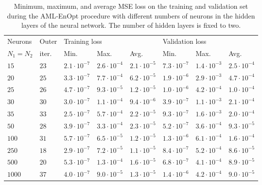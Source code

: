 \begin{table}
\caption{\label{DNNLossComparison}Minimum, maximum, and average MSE loss on the training and validation set during the AML-EnOpt procedure with different numbers of neurons in the hidden layers of the neural network. The number of hidden layers is fixed to two.}
\centering
\begin{tabular}{|l|l|lll|lll|}
\hline
Neurons & Outer  & \multicolumn{3}{l|}{Training loss} & \multicolumn{3}{l|}{Validation loss} \\
\cline{3-5}\cline{6-8}
$N_1=N_2$ & iter. & Min. & Max. & Avg. & Min. & Max. & Avg.\\
\hline
$15$ & $23$ & $2.1\cdot10^{-7}$ & $2.6\cdot10^{-4}$ & $2.1\cdot10^{-5}$ & $7.3\cdot10^{-7}$ & $1.4\cdot10^{-3}$ & $2.5\cdot10^{-4}$\\
$20$ & $25$ & $3.3\cdot10^{-7}$ & $7.7\cdot10^{-4}$ & $6.2\cdot10^{-5}$ & $1.9\cdot10^{-6}$ & $2.9\cdot10^{-3}$ & $4.7\cdot10^{-4}$\\
$25$ & $26$ & $4.7\cdot10^{-7}$ & $9.3\cdot10^{-5}$ & $1.2\cdot10^{-5}$ & $1.0\cdot10^{-6}$ & $4.2\cdot10^{-4}$ & $1.0\cdot10^{-4}$\\
$30$ & $30$ & $3.0\cdot10^{-7}$ & $1.1\cdot10^{-4}$ & $9.4\cdot10^{-6}$ & $3.9\cdot10^{-7}$ & $1.1\cdot10^{-3}$ & $2.1\cdot10^{-4}$\\
$35$ & $33$ & $2.5\cdot10^{-7}$ & $5.7\cdot10^{-4}$ & $2.2\cdot10^{-5}$ & $9.3\cdot10^{-7}$ & $1.6\cdot10^{-3}$ & $2.0\cdot10^{-4}$\\
$50$ & $28$ & $3.9\cdot10^{-7}$ & $3.3\cdot10^{-4}$ & $2.3\cdot10^{-5}$ & $5.2\cdot10^{-7}$ & $3.6\cdot10^{-4}$ & $9.3\cdot10^{-5}$\\
$100$ & $31$ & $5.7\cdot10^{-7}$ & $6.5\cdot10^{-5}$ & $1.2\cdot10^{-5}$ & $1.3\cdot10^{-6}$ & $6.1\cdot10^{-4}$ & $1.6\cdot10^{-4}$\\
$250$ & $18$ & $2.9\cdot10^{-7}$ & $7.2\cdot10^{-5}$ & $1.1\cdot10^{-5}$ & $8.4\cdot10^{-7}$ & $5.2\cdot10^{-4}$ & $8.6\cdot10^{-5}$\\
$500$ & $20$ & $5.3\cdot10^{-7}$ & $1.3\cdot10^{-4}$ & $1.6\cdot10^{-5}$ & $6.8\cdot10^{-7}$ & $4.1\cdot10^{-4}$ & $8.9\cdot10^{-5}$\\
$1000$ & $37$ & $4.0\cdot10^{-7}$ & $9.0\cdot10^{-5}$ & $1.3\cdot10^{-5}$ & $1.4\cdot10^{-6}$ & $4.2\cdot10^{-4}$ & $9.0\cdot10^{-5}$\\
\hline
\end{tabular}
\end{table}

